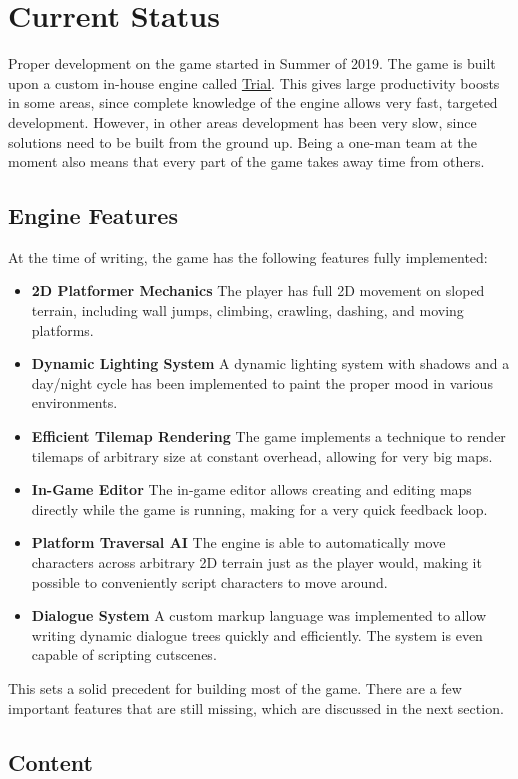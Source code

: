 \section{Current Status}
Proper development on the game started in Summer of 2019. The game is built upon a custom in-house engine called \href{https://shirakumo.org/trial}{Trial}. This gives large productivity boosts in some areas, since complete knowledge of the engine allows very fast, targeted development. However, in other areas development has been very slow, since solutions need to be built from the ground up. Being a one-man team at the moment also means that every part of the game takes away time from others.

\subsection{Engine Features}
At the time of writing, the game has the following features fully implemented:

\begin{itemize}
\item \textbf{2D Platformer Mechanics}\quad
  The player has full 2D movement on sloped terrain, including wall jumps, climbing, crawling, dashing, and moving platforms.
\item \textbf{Dynamic Lighting System}\quad
  A dynamic lighting system with shadows and a day/night cycle has been implemented to paint the proper mood in various environments.
\item \textbf{Efficient Tilemap Rendering}\quad
  The game implements a technique to render tilemaps of arbitrary size at constant overhead, allowing for very big maps.
\item \textbf{In-Game Editor}\quad
  The in-game editor allows creating and editing maps directly while the game is running, making for a very quick feedback loop.
\item \textbf{Platform Traversal AI}\quad
  The engine is able to automatically move characters across arbitrary 2D terrain just as the player would, making it possible to conveniently script characters to move around.
\item \textbf{Dialogue System}\quad
  A custom markup language was implemented to allow writing dynamic dialogue trees quickly and efficiently. The system is even capable of scripting cutscenes.
\end{itemize}

This sets a solid precedent for building most of the game. There are a few important features that are still missing, which are discussed in the next section.

\clearpage
\subsection{Content}



